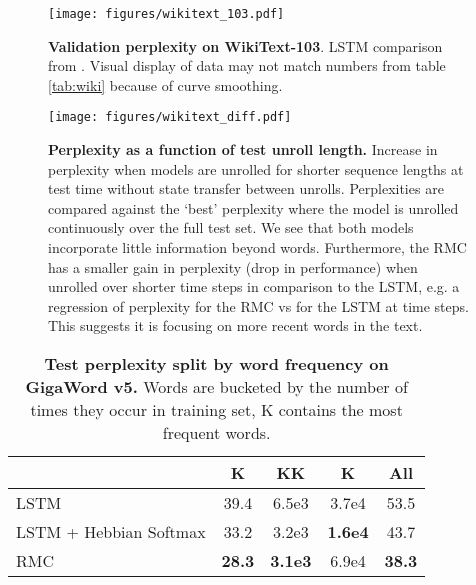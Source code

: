 \documentclass{article}
\begin{document}
\begin{figure}[h!]
    \centering
    \texttt{[image: figures/wikitext\_103.pdf]}
    \caption{\textbf{Validation perplexity on WikiText-103}. LSTM comparison from \cite{rae2018fast}. Visual display of data may not match numbers from table \ref{tab:wiki} because of curve smoothing.}
    \label{fig:wiki_curves}
\end{figure}

\begin{figure}[h!]
    \centering
    \texttt{[image: figures/wikitext\_diff.pdf]}
    \caption{\textbf{Perplexity as a function of test unroll length.} Increase in perplexity when models are unrolled for shorter sequence lengths at test time without state transfer between unrolls. Perplexities are compared against the `best' perplexity where the model is unrolled continuously over the full test set. We see that both models incorporate little information beyond  words. Furthermore, the RMC has a smaller gain in perplexity (drop in performance) when unrolled over shorter time steps in comparison to the LSTM, e.g. a regression of  perplexity for the RMC vs  for the LSTM at  time steps. This suggests it is focusing on more recent words in the text.}
    \label{fig:wiki_context_length}
\end{figure}

\begin{table}[h!]
    \caption{\textbf{Test perplexity split by word frequency on GigaWord v5.} Words are bucketed by the number of times they occur in training set, K contains the most frequent words.}
    \centering
    \begin{tabular}{lcccc}
    \toprule
    & K & KK & K & All \\ 
    \midrule
    LSTM                   \cite{rae2018fast} & 39.4 & 6.5e3 & 3.7e4 & 53.5  \\ 
    LSTM + Hebbian Softmax \cite{rae2018fast} & 33.2 & 3.2e3 & \textbf{1.6e4} & 43.7 \\ 
    RMC                     & \textbf{28.3} & \textbf{3.1e3} & 6.9e4 & \textbf{38.3} \\
    \bottomrule
    \end{tabular}
    \label{tab:giga_word_frequency}
\end{table}


 
\end{document}
